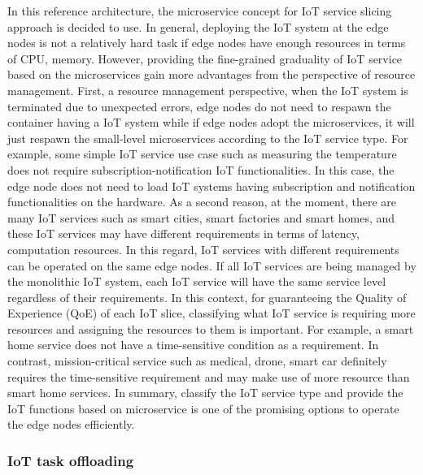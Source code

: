 In this reference architecture, the microservice concept for IoT service slicing approach is decided to use. In general, deploying the IoT system at the edge nodes is not a relatively hard task if edge nodes have enough resources in terms of CPU, memory. However, providing the fine-grained graduality of IoT service based on the microservices gain more advantages from the perspective of resource management. First, a resource management perspective, when the IoT system is terminated due to unexpected errors, edge nodes do not need to respawn the container having a IoT system while if edge nodes adopt the microservices, it will just respawn the small-level microservices according to the IoT service type. For example, some simple IoT service use case such as measuring the temperature does not require subscription-notification IoT functionalities. In this case, the edge node does not need to load IoT systems having subscription and notification functionalities on the hardware. As a second reason, at the moment, there are many IoT services such as smart cities, smart factories and smart homes, and these IoT services may have different requirements in terms of latency, computation resources. In this regard, IoT services with different requirements can be operated on the same edge nodes. If all IoT services are being managed by the monolithic IoT system, each IoT service will have the same service level regardless of their requirements. In this context, for guaranteeing the Quality of Experience (QoE) of each IoT slice, classifying what IoT service is requiring more resources and assigning the resources to them is important. For example, a smart home service does not have a time-sensitive condition as a requirement. In contrast, mission-critical service such as medical, drone, smart car definitely requires the time-sensitive requirement and may make use of more resource than smart home services. In summary, classify the IoT service type and provide the IoT functions based on microservice is one of the promising options to operate the edge nodes efficiently. 

\subsubsection{IoT task offloading}
\label{sec:iot_task_offloading_procedures}

